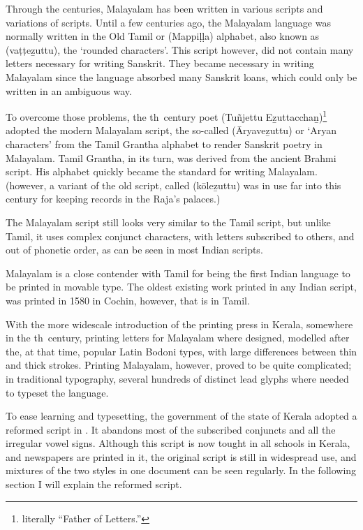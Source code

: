 Through the centuries, Malayalam has been written in various scripts
and variations of scripts. Until a few centuries ago, the Malayalam
language was normally written in the Old Tamil or {\mm {}}
({\mmtr Mappi\d l\d la}) alphabet, also known as {\mm {}}
({\mmtr va\d t\d te\b zuttu}), the `rounded characters'. This script however, did
not contain many letters necessary for writing Sanskrit. They became
necessary in writing Malayalam since the language absorbed many
Sanskrit loans, which could only be written in an ambiguous way.

To overcome those problems, the {}th~century poet {\mm {}
} ({\mmtr Tu\~njettu E\b zuttaccha\b n})\footnote*{literally
``Father of Letters.''} adopted the modern Malayalam script, the
so-called {\mm {}} ({\mmtr \=Aryave\b zuttu}) or `Aryan characters'
from the Tamil Grantha alphabet to render Sanskrit poetry in
Malayalam. Tamil Grantha, in its turn, was derived from the ancient
Brahmi script. His alphabet quickly became the standard for writing
Malayalam. (however, a variant of the old script, called {\mm {}}
({\mmtr k\=ole\b zuttu}) was in use far into this century for keeping records
in the Raja's palaces.)

The Malayalam script still looks very similar to the Tamil script, but
unlike Tamil, it uses complex conjunct characters, with letters
subscribed to others, and out of phonetic order, as can be seen in
most Indian scripts.

Malayalam is a close contender with Tamil for being the first Indian
language to be printed in movable type. The oldest existing work printed
in any Indian script, was printed in 1580 in Cochin, however, that is
in Tamil.

With the more widescale introduction of the printing press in Kerala, somewhere in
the {}th~century, printing letters for Malayalam where designed,
modelled after the, at that time, popular Latin Bodoni types, with
large differences between thin and thick strokes. Printing Malayalam,
however, proved to be quite complicated; in traditional typography,
several hundreds of distinct lead glyphs where needed to typeset the
language.

To ease learning and typesetting, the government of the state of
Kerala adopted a reformed script in {}. It abandons most of the
subscribed conjuncts and all the irregular vowel signs. Although this
script is now tought in all schools in Kerala, and newspapers are
printed in it, the original script is still in widespread use, and
mixtures of the two styles in one document can be seen regularly. In
the following section I will explain the reformed script.

